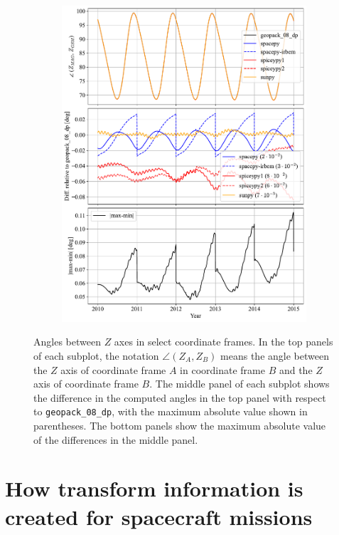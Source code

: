 \documentclass[draft]{agujournal2019}
\begin{document}
\begin{figure}[htb]
\begin{subfigure}[b]{0.49\textwidth}
         \includegraphics[width=\textwidth]{code/figures/angles/delta=1days_20100101-20150101/MAG_GSM.pdf}
     \end{subfigure}
     \caption{Angles between $Z$ axes in select coordinate frames. In the top panels of each subplot, the notation $\angle (Z_A, Z_B)$ means the angle between the $Z$ axis of coordinate frame $A$ in coordinate frame $B$ and the $Z$ axis of coordinate frame $B$. The middle panel of each subplot shows the difference in the computed angles in the top panel with respect to \texttt{geopack\_08\_dp}, with the maximum absolute value shown in parentheses. The bottom panels show the maximum absolute value of the differences in the middle panel.}
     \label{fig:angles}
\end{figure}

\clearpage

\section{How transform information is created for spacecraft missions}
\label{sect:missions}
\end{document}
